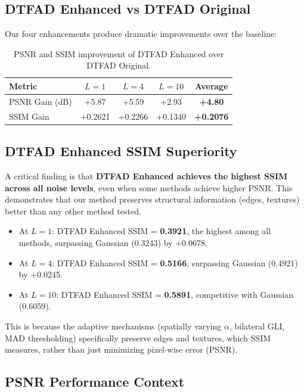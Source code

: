 \documentclass[12pt,a4paper]{article}
\begin{document}
\subsection{DTFAD Enhanced vs DTFAD Original}

Our four enhancements produce dramatic improvements over the baseline:

\begin{table}[H]
\centering
\caption{PSNR and SSIM improvement of DTFAD Enhanced over DTFAD Original.}
\label{tab:improvement}
\begin{tabular}{lcccc}
\toprule
\textbf{Metric} & \textbf{$L=1$} & \textbf{$L=4$} & \textbf{$L=10$} & \textbf{Average} \\
\midrule
PSNR Gain (dB) & +5.87 & +5.59 & +2.93 & \textbf{+4.80} \\
SSIM Gain & +0.2621 & +0.2266 & +0.1340 & \textbf{+0.2076} \\
\bottomrule
\end{tabular}
\end{table}

\subsection{DTFAD Enhanced SSIM Superiority}

A critical finding is that \textbf{DTFAD Enhanced achieves the highest SSIM across all noise levels}, even when some methods achieve higher PSNR. This demonstrates that our method preserves structural information (edges, textures) better than any other method tested.

\begin{itemize}
\item At $L=1$: DTFAD Enhanced SSIM = \textbf{0.3921}, the highest among all methods, surpassing Gaussian (0.3243) by +0.0678.
\item At $L=4$: DTFAD Enhanced SSIM = \textbf{0.5166}, surpassing Gaussian (0.4921) by +0.0245.
\item At $L=10$: DTFAD Enhanced SSIM = \textbf{0.5891}, competitive with Gaussian (0.6059).
\end{itemize}

This is because the adaptive mechanisms (spatially varying $\alpha$, bilateral GLI, MAD thresholding) specifically preserve edges and textures, which SSIM measures, rather than just minimizing pixel-wise error (PSNR).

\subsection{PSNR Performance Context}
\end{document}

